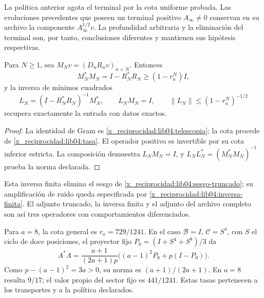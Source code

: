 La política anterior agota el terminal por la cota uniforme probada.
Las evoluciones precedentes que poseen un terminal positivo
\(A_\infty\neq0\) conservan en su archivo la componente
\(A_\infty^{1/2}v\). La profundidad arbitraria y la eliminación del
terminal son, por tanto, conclusiones diferentes y mantienen sus
hipótesis respectivas.

\begin{proposition}
\label{x_reciprocidad:lib04:prop-inversa-finita}
Para \(N\geq1\), sea \(M_Nv=(D_nR_nv)_{n<N}\). Entonces
\begin{equation}
 M_N^*M_N=I-R_N^*R_N\geq(1-r_a^N)I,
 \label{x_reciprocidad:lib04:gram-finito}
\end{equation}
y la inversa de mínimos cuadrados
\begin{equation}
 L_N=(I-R_N^*R_N)^{-1}M_N^*,\qquad
 L_NM_N=I,\qquad
 \|L_N\|\leq(1-r_a^N)^{-1/2}
 \label{x_reciprocidad:lib04:inversa-finita}
\end{equation}
recupera exactamente la entrada con datos exactos.
\end{proposition}

\begin{proof}
La identidad de Gram es \eqref{x_reciprocidad:lib04:telescopia}; la cota procede de
\eqref{x_reciprocidad:lib04:tasa}. El operador positivo es invertible por su cota
inferior estricta. La composición demuestra \(L_NM_N=I\), y
\(L_NL_N^*=(M_N^*M_N)^{-1}\) prueba la norma declarada.
\end{proof}

Esta inversa finita elimina el sesgo de
\eqref{x_reciprocidad:lib04:sesgo-truncado}; su amplificación de ruido queda
especificada por \eqref{x_reciprocidad:lib04:inversa-finita}. El adjunto truncado,
la inversa finita y el adjunto del archivo completo son así tres
operadores con comportamientos diferenciados.

Para \(a=8\), la cota general es \(r_a=729/1241\). En el caso
\(\mathcal B=I\), \(\mathcal C=S^4\), con \(S\) el ciclo de
doce posiciones, el proyector fijo
\(P_0=(I+S^4+S^8)/3\) da
\begin{equation}
 A^*A=\frac{a+1}{(2a+1)p}
       \bigl((a-1)^2P_0+p(I-P_0)\bigr).
 \label{x_reciprocidad:lib04:gram-tasa-ternaria}
\end{equation}
Como \(p-(a-1)^2=3a>0\), su norma es
\((a+1)/(2a+1)\). En \(a=8\) resulta \(9/17\); el valor propio
del sector fijo es \(441/1241\). Estas tasas pertenecen a los
transportes y a la política declarados.

